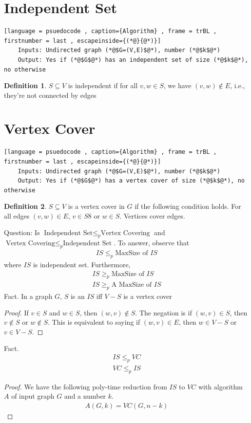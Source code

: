 \documentclass[a4paper]{article}
\theoremstyle{plain}
\theoremstyle{definition}
\newtheorem{defn}{Definition}[section]
\theoremstyle{remark}
\begin{document}
	\section{Independent Set}
	\begin{lstlisting}[language = psuedocode , caption={Algorithm} , frame = trBL , firstnumber = last , escapeinside={(*@}{@*)}]
	Inputs: Undirected graph (*@$G=(V,E)$@*), number (*@$k$@*)
	Output: Yes if (*@$G$@*) has an independent set of size (*@$k$@*), no otherwise
	\end{lstlisting}	
	\begin{defn}
		$S \subseteq V$ is independent if for all $v,w \in S$, we have $(v,w) \not\in E$, i.e., they're not connected by edges
	\end{defn}
	\section{Vertex Cover}
	\begin{lstlisting}[language = psuedocode , caption={Algorithm} , frame = trBL , firstnumber = last , escapeinside={(*@}{@*)}]
	Inputs: Undirected graph (*@$G=(V,E)$@*), number (*@$k$@*)
	Output: Yes if (*@$G$@*) has a vertex cover of size (*@$k$@*), no otherwise
	\end{lstlisting}	
	\begin{defn}
		$S \subseteq V$ is a vertex cover in $G$ if the following condition holds. For all edges $(v,w) \in E$, $v \in S$8 or $w \in S$. Vertices cover edges.
	\end{defn}
	Question: Is $\text{Independent Set} \le_p \text{Vertex Covering}$ and $\text{Vertex Covering}\le_p \text{Independent Set}$. To answer, observe that
	\begin{align*}
		IS \le_p \text{MaxSize of }IS
	\end{align*}
	where $IS$ is independent set. Furthermore,
	\begin{align*}
		IS \ge_p \text{MaxSize of }IS \\
		IS \ge_p \text{A MaxSize of }IS
	\end{align*}
	Fact. In a graph $G$, $S$ is an $IS$ iff $V-S$ is a vertex cover
	\begin{proof}
		If $v \in S$ and $w \in S$, then $(w,v) \not\in S$. The negation is if $(w,v) \in S$, then $v \not\in S$ or $w \not\in S$. This is equivalent to saying if $(w,v) \in E$, then $w \in V-S$ or $v \in V-S$.
	\end{proof}
	Fact.
	\begin{align*}
		IS \le_p VC \\
		VC \le_p IS
	\end{align*}
	\begin{proof}
		We have the following poly-time reduction from $IS$ to $VC$ with algorithm $A$ of input graph $G$ and a number $k$.
		\begin{align*}
			A(G,k) = VC(G,n-k)
		\end{align*}
	\end{proof}
\end{document}
